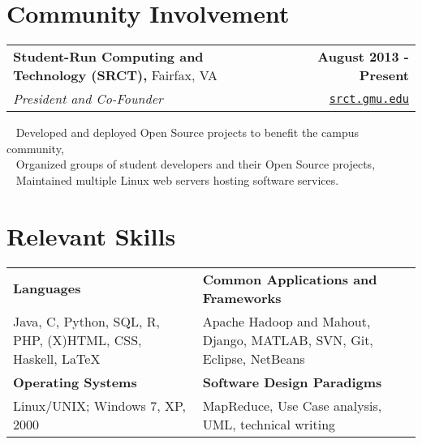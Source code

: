 \documentclass[letterpaper]{article}
\newcommand{\detail}{\indent\textbullet ~ }
\begin{document}
%


  \section{Community Involvement}
  \noindent
  \begin{tabularx}{\textwidth}{@{}X r@{}}
    \textbf{Student-Run Computing and Technology (SRCT),} Fairfax, VA & \textbf{August 2013 - Present} \\
    \emph{President and Co-Founder} & \texttt{\href{srct.gmu.edu}{srct.gmu.edu}} \\[0.2cm]
  \end{tabularx}

  \detail Developed and deployed Open Source projects to benefit the campus community,\\
  \detail Organized groups of student developers and their Open Source projects,\\
  \detail Maintained multiple Linux web servers hosting software services.\\


  \section{Relevant Skills}
  \noindent
  \begin{tabularx}{\textwidth}{@{}X X@{}}
    \textbf{Languages}                                          &  \textbf{Common Applications and Frameworks} \\
    Java, C, Python, SQL, R, PHP, (X)HTML, CSS, Haskell, \LaTeX &  Apache Hadoop and Mahout, Django, MATLAB, SVN, Git, Eclipse, NetBeans \\[0.2cm]
    \textbf{Operating Systems}                                  &  \textbf{Software Design Paradigms} \\
    Linux/UNIX; Windows 7, XP, 2000                             &  MapReduce, Use Case analysis, UML, technical writing
  \end{tabularx}


\end{document}
